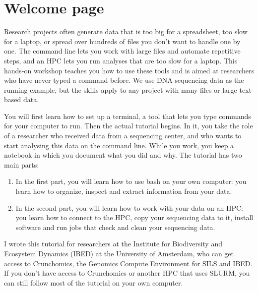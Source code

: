 \documentclass[
  letterpaper,
  DIV=11,
  numbers=noendperiod]{scrreprt}
\author{}
\date{}
\providecommand{\tightlist}{%
  \setlength{\itemsep}{0pt}\setlength{\parskip}{0pt}}
\renewcommand*\contentsname{Table of contents}
\newcommand\contentsname{Table of contents}
\begin{document}

\renewcommand*\contentsname{Table of contents}
{
\hypersetup{linkcolor=}
\setcounter{tocdepth}{1}
\tableofcontents
}

\section{Welcome page}\label{welcome-page}

Research projects often generate data that is too big for a spreadsheet,
too slow for a laptop, or spread over hundreds of files you don't want
to handle one by one. The command line lets you work with large files
and automate repetitive steps, and an HPC lets you run analyses that are
too slow for a laptop. This hands-on workshop teaches you how to use
these tools and is aimed at researchers who have never typed a command
before. We use DNA sequencing data as the running example, but the
skills apply to any project with many files or large text-based data.

You will first learn how to set up a terminal, a tool that lets you type
commands for your computer to run. Then the actual tutorial begins. In
it, you take the role of a researcher who received data from a
sequencing center, and who wants to start analysing this data on the
command line. While you work, you keep a notebook in which you document
what you did and why. The tutorial has two main parts:

\begin{enumerate}
\def\labelenumi{\arabic{enumi}.}
\tightlist
\item
  In the first part, you will learn how to use bash on your own
  computer: you learn how to organize, inspect and extract information
  from your data.
\item
  In the second part, you will learn how to work with your data on an
  HPC: you learn how to connect to the HPC, copy your sequencing data to
  it, install software and run jobs that check and clean your sequencing
  data.
\end{enumerate}

I wrote this tutorial for researchers at the Institute for Biodiversity
and Ecosystem Dynamics (IBED) at the University of Amsterdam, who can
get access to Crunchomics, the Genomics Compute Environment for SILS and
IBED. If you don't have access to Crunchomics or another HPC that uses
SLURM, you can still follow most of the tutorial on your own computer.
\end{document}
